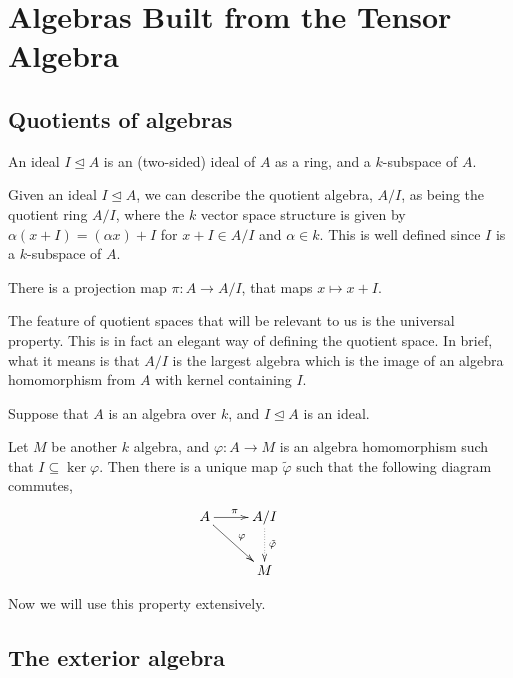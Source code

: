 \documentclass{owmaths}
\begin{document}
\section{Algebras Built from the Tensor Algebra}
\subsection{Quotients of algebras}

An ideal $I \unlhd A$ is an (two-sided) ideal of $A$ as a ring, and a $k$-subspace of $A$. 

Given an ideal $I \unlhd A$, we can describe the quotient algebra, $A/I$,
as being the quotient ring $A/I$, where the $k$ vector space structure
is given by $\alpha(x+I) = (\alpha x) + I$ for $x + I \in A/I$
and $\alpha \in k$. This is well defined since $I$ is a $k$-subspace of $A$.

There is a projection map $\pi:A\rightarrow A/I$, that maps $x \mapsto x+I$.

The feature of quotient spaces that will be relevant to us is the universal property.
This is in fact an elegant way of defining the quotient space. In brief, what it
means is that $A/I$ is the largest algebra which is the image of an algebra homomorphism
from $A$ with kernel containing $I$.
\begin{proposition}
    Suppose that $A$ is an algebra over $k$, and $I \unlhd A$ is an ideal.
    
    Let $M$ be another $k$ algebra, and $\varphi:A\rightarrow M$
    is an algebra homomorphism such that $I \subseteq \ker\varphi$.
    Then there is a unique map $\tilde{\varphi}$ such that the following
    diagram commutes,
    \begin{displaymath}
    \xymatrix{
        A \ar[r]^\pi \ar[rd]^\varphi&
        A/I \ar@{.>}[d]^{\tilde{\varphi}}&\\
        &
        M
    }
    \end{displaymath}
\end{proposition}

Now we will use this property extensively. 

\subsection{The exterior algebra}
\end{document}
